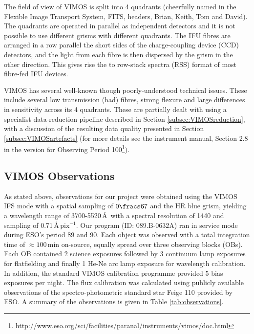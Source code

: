 		The field of view of VIMOS is split into 4 quadrants (cheerfully named in the Flexible Image Transport System, FITS, headers, Brian, Keith, Tom and David). The quadrants are operated in parallel as independent detectors and it is not possible to use different grisms with different quadrants. The IFU fibres are arranged in a row parallel the short sides of the charge-coupling device (CCD) detectors, and the light from each fibre is then dispersed by the grism in the other direction. This gives rise the to row-stack spectra (RSS) format of most fibre-fed IFU devices.

		VIMOS has several well-known though poorly-understood technical issues. These include several low transmission (bad) fibres, strong flexure and large differences in sensitivity across its 4 quadrants. These are partially dealt with using a specialist data-reduction pipeline described in Section \ref{subsec:VIMOSreduction}, with a discussion of the resulting data quality presented in Section \ref{subsec:VIMOSartefacts} (for more details see the instrument manual, Section 2.8 in the version for Observing Period 100\footnote{http://www.eso.org/sci/facilities/paranal/instruments/vimos/doc.html}).

	\subsection{VIMOS Observations}
		As stated above,  observations for our project were obtained using the VIMOS IFS mode with a spatial sampling of $0\fracs67$ and the HR blue grism, yielding a wavelength range of 3700-5520\,\AA\ with a spectral resolution of 1440 and sampling of 0.71\,\AA\,$\mathrm{pix^{-1}}$. Our program (ID: 089.B-0632A) ran in service mode during ESO's period 89 and 90. Each object was observed with a total integration time of $\approx 100$\,min on-source, equally spread over three observing blocks (OBs). Each OB contained 2 science exposures followed by 3 continuum lamp exposures for flatfielding and finally 1 He-Ne arc lamp exposure for wavelength calibration. In addition, the standard VIMOS calibration programme provided 5 bias exposures per night. The flux calibration was calculated using publicly available observations of the spectro-photometric standard star Feige 110 provided by ESO. A summary of the observations is given in Table \ref{tab:observations}.

